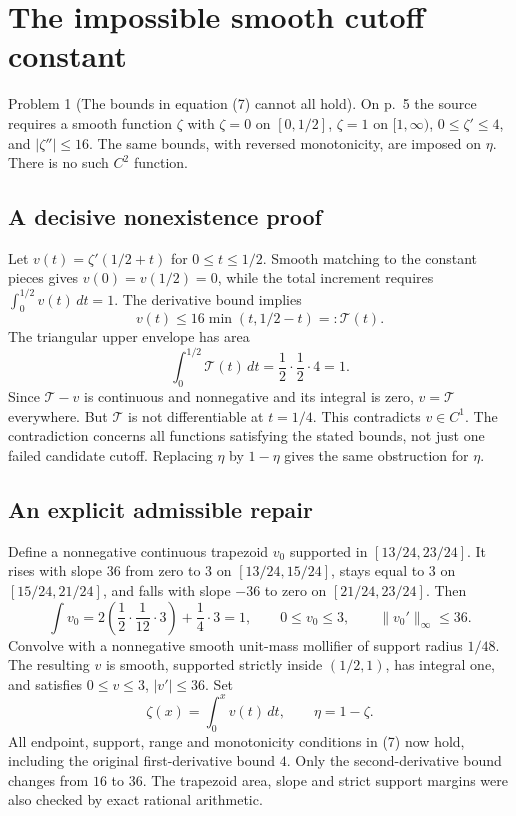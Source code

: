 \documentclass[10pt]{article}
\begin{document}
\section*{The impossible smooth cutoff constant}
Problem 1 (The bounds in equation (7) cannot all hold).  On p. 5 the source requires a smooth function \(\zeta\) with \(\zeta=0\) on \([0,1/2]\), \(\zeta=1\) on \([1,\infty)\), \(0\leq\zeta'\leq4\), and \(|\zeta''|\leq16\). The same bounds, with reversed monotonicity, are imposed on \(\eta\). There is no such \(C^2\) function.\par
\subsection*{A decisive nonexistence proof}
Let \(v(t)=\zeta'(1/2+t)\) for \(0\leq t\leq1/2\). Smooth matching to the constant pieces gives \(v(0)=v(1/2)=0\), while the total increment requires \(\int_0^{1/2}v(t)\,dt=1\). The derivative bound implies \[v(t)\leq16\min(t,1/2-t)=:\mathcal T(t).\] The triangular upper envelope has area \[\int_0^{1/2}\mathcal T(t)\,dt
 =\frac12\cdot\frac12\cdot4=1.\] Since \(\mathcal T-v\) is continuous and nonnegative and its integral is zero, \(v=\mathcal T\) everywhere. But \(\mathcal T\) is not differentiable at \(t=1/4\). This contradicts \(v\in C^1\). The contradiction concerns all functions satisfying the stated bounds, not just one failed candidate cutoff. Replacing \(\eta\) by \(1-\eta\) gives the same obstruction for \(\eta\).\par
\subsection*{An explicit admissible repair}
Define a nonnegative continuous trapezoid \(v_0\) supported in \([13/24,23/24]\). It rises with slope \(36\) from zero to \(3\) on \([13/24,15/24]\), stays equal to \(3\) on \([15/24,21/24]\), and falls with slope \(-36\) to zero on \([21/24,23/24]\). Then \[\int v_0
 =2\left(\frac12\cdot\frac1{12}\cdot3\right)
       +\frac14\cdot3=1,\qquad
 0\leq v_0\leq3,\qquad \|v_0'\|_\infty\leq36.\] Convolve with a nonnegative smooth unit-mass mollifier of support radius \(1/48\). The resulting \(v\) is smooth, supported strictly inside \((1/2,1)\), has integral one, and satisfies \(0\leq v\leq3\), \(|v'|\leq36\). Set \[\zeta(x)=\int_0^x v(t)\,dt,\qquad \eta=1-\zeta.\] All endpoint, support, range and monotonicity conditions in (7) now hold, including the original first-derivative bound \(4\). Only the second-derivative bound changes from \(16\) to \(36\). The trapezoid area, slope and strict support margins were also checked by exact rational arithmetic.\par
\end{document}
